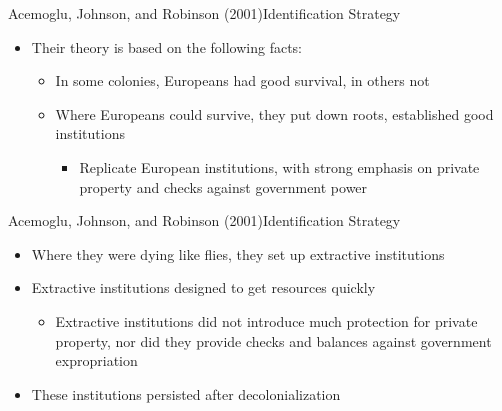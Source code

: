 \documentclass[dvipsnames,hyperref={pdfpagelabels=false}]{beamer}
\begin{document}
\begin{frame}{Acemoglu, Johnson, and Robinson (2001)}{Identification Strategy}
	\begin{itemize}
		\item Their theory is based on the following facts:
		\vspace{0.2cm}
			\begin{itemize}
		\item[1] In some colonies, Europeans had good survival, in others not
		\vspace{0.2cm}
		\item[2] Where Europeans could survive, they put down roots, established good institutions
		\vspace{0.2cm}
		\begin{itemize}
			\item Replicate European institutions, with strong 
			emphasis on private property and checks against government power
		\end{itemize}
			\end{itemize}
	\end{itemize}
\end{frame}






\begin{frame}{Acemoglu, Johnson, and Robinson (2001)}{Identification Strategy}
	\begin{itemize}
		\item[3] Where they were dying like flies, they set up extractive institutions
		\vspace{0.2cm}
		\item[4] Extractive institutions designed to get resources quickly
		\vspace{0.2cm}
		\begin{itemize}
			\item  Extractive institutions did not introduce much protection for private property, nor did they provide checks and balances against government expropriation
		\end{itemize}
		\vspace{0.2cm}
		\item These institutions persisted after decolonialization
		
	\end{itemize}
\end{frame}
\end{document}
